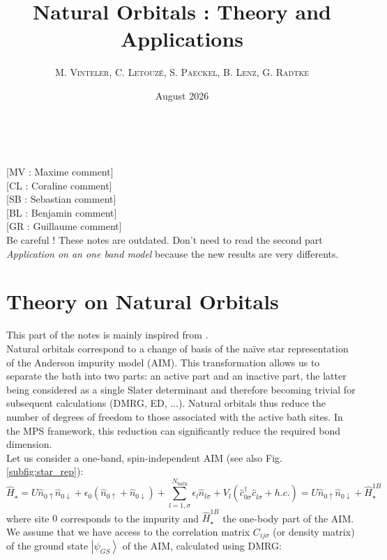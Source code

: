 \documentclass[11pt]{article}
\title{\LARGE \textbf{Natural Orbitals : Theory and Applications}}
\author{\large M. \textsc{Vinteler}, C. \textsc{Letouzé}, S. \textsc{Paeckel}, B. \textsc{Lenz}, G. \textsc{Radtke}}
\date{August 2026}
\newcommand{\hamiltonian}{\hat{H}}
\newcommand{\creation}[1]{\hat{c}_{{#1}}^{\dagger}}
\newcommand{\annihilation}[1]{\hat{c}_{{#1}}^{\phantom{\dagger}}}
\newcommand{\occupation}[1]{\hat{n}_{{#1}}}
\newcommand{\ket}[1]{\left| {#1} \right>}
\begin{document}
\begin{center}
    \@title \\
    \vspace{0.1cm}
    \@author
\end{center}
{\color{blue}[MV : Maxime comment]}\\
{\color{violet}[CL : Coraline comment]}\\
{\color{teal}[SB : Sebastian comment]}\\
{\color{red}[BL : Benjamin comment]}\\
{\color{orange}[GR : Guillaume comment]}\\
{\color{red}\Large Be careful ! These notes are outdated. Don't need to read the second part \textit{Application on an one band model} because the new results are very differents.}
\section{Theory on Natural Orbitals}\label{section:intro}
This part of the notes is mainly inspired from \cite{kaye_natural_nodate, lu_natural-orbital_2019, lu_efficient_2014}.\\
Natural orbitals correspond to a change of basis of the naïve star representation of the Anderson impurity model (AIM). This transformation allows us to separate the bath into two parts: an active part and an inactive part, the latter being considered as a single Slater determinant and therefore becoming trivial for subsequent calculations (DMRG, ED, ...). Natural orbitals thus reduce the number of degrees of freedom to those associated with the active bath sites. In the MPS framework, this reduction can significantly reduce the required bond dimension.\\
Let us consider a one-band, spin-independent AIM (see also Fig. \ref{subfig:star_rep}):
\begin{equation}\label{eq:star_rep}
\hamiltonian_\star = U \occupation{0\uparrow}\occupation{0\downarrow} + \epsilon_0 (\occupation{0\uparrow} + \occupation{0\downarrow}) + \sum_{l=1,\sigma}^{N_{\text{bath}}} \epsilon_l \occupation{l\sigma} + V_l(\creation{0\sigma} \annihilation{l\sigma} + h.c.) = U \occupation{0\uparrow}\occupation{0\downarrow} + \hamiltonian_\star^{1B}
\end{equation}
where site $0$ corresponds to the impurity and $\hamiltonian_\star^{1B}$ the one-body part of the AIM. We assume that we have access to the correlation matrix $C_{ij\sigma}$ (or density matrix) of the ground state $\ket{\psi_{GS}}$ of the AIM, calculated using DMRG:
\end{document}
